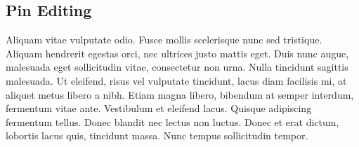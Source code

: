 \subsection{Pin Editing}
Aliquam vitae vulputate odio. Fusce mollis scelerisque nunc sed tristique. Aliquam hendrerit egestas orci, nec ultrices justo mattis eget. Duis nunc augue, malesuada eget sollicitudin vitae, consectetur non urna. Nulla tincidunt sagittis malesuada. Ut eleifend, risus vel vulputate tincidunt, lacus diam facilisis mi, at aliquet metus libero a nibh. Etiam magna libero, bibendum at semper interdum, fermentum vitae ante. Vestibulum et eleifend lacus. Quisque adipiscing fermentum tellus. Donec blandit nec lectus non luctus. Donec et erat dictum, lobortis lacus quis, tincidunt massa. Nunc tempus sollicitudin tempor.